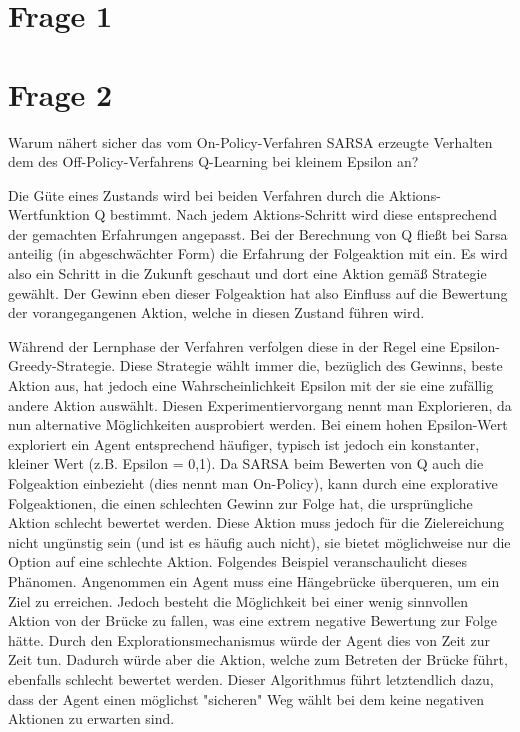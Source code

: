 \documentclass[10pt]{scrartcl}
\author{Steffen Brauer, André Harms,\\ Florian Johannßen, Jan-Christoph Meier,\\ Florian Ocker, Olaf Potratz,\\ Torben Woggan}
\title{\titletext}
\date{10.06.2012}
\begin{document}
\maketitle

\setcounter{tocdepth}{3}
\tableofcontents

	\listoffigures  
\newpage
\section{Frage 1}

\section{Frage 2}
Warum nähert sicher das vom On-Policy-Verfahren SARSA erzeugte Verhalten dem des Off-Policy-Verfahrens Q-Learning bei kleinem Epsilon an?

Die Güte eines Zustands wird bei beiden Verfahren durch die Aktions-Wertfunktion Q bestimmt. Nach jedem Aktions-Schritt wird diese entsprechend der gemachten Erfahrungen angepasst. Bei der Berechnung von Q fließt bei Sarsa anteilig (in abgeschwächter Form) die Erfahrung der Folgeaktion mit ein. Es wird also ein Schritt in die Zukunft geschaut und dort eine Aktion gemäß Strategie gewählt. Der Gewinn eben dieser Folgeaktion hat also Einfluss auf die Bewertung der vorangegangenen Aktion, welche in diesen Zustand führen wird. 

Während der Lernphase der Verfahren verfolgen diese in der Regel eine Epsilon-Greedy-Strategie. Diese Strategie wählt immer die, bezüglich des Gewinns, beste Aktion aus, hat jedoch eine Wahrscheinlichkeit Epsilon mit der sie eine zufällig andere Aktion auswählt. Diesen Experimentiervorgang nennt man Explorieren, da nun alternative Möglichkeiten ausprobiert werden. Bei einem hohen Epsilon-Wert exploriert ein Agent entsprechend häufiger, typisch ist jedoch ein konstanter, kleiner Wert (z.B. Epsilon = 0,1).
Da SARSA beim Bewerten von Q auch die Folgeaktion einbezieht (dies nennt man On-Policy), kann durch eine explorative Folgeaktionen, die einen schlechten Gewinn zur Folge hat, die ursprüngliche Aktion schlecht bewertet werden. Diese Aktion muss jedoch für die Zielereichung nicht ungünstig sein (und ist es häufig auch nicht), sie bietet möglichweise nur die Option auf eine schlechte Aktion. Folgendes Beispiel veranschaulicht dieses Phänomen. Angenommen ein Agent muss eine Hängebrücke überqueren, um ein Ziel zu erreichen. Jedoch besteht die Möglichkeit bei einer wenig sinnvollen Aktion von der Brücke zu fallen, was eine extrem negative Bewertung zur Folge hätte. Durch den Explorationsmechanismus würde der Agent dies von Zeit zur Zeit tun. Dadurch würde aber die Aktion, welche zum Betreten der Brücke führt, ebenfalls schlecht bewertet werden. Dieser Algorithmus führt letztendlich dazu, dass der Agent einen möglichst "sicheren" Weg wählt bei dem keine negativen Aktionen zu erwarten sind.
\end{document}
